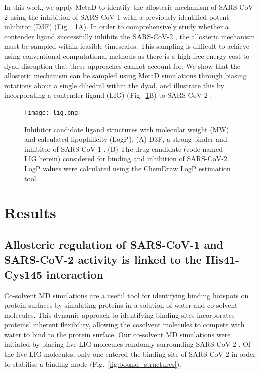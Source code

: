 In this work, we apply MetaD to identify the allosteric mechanism of SARS-CoV-2 \mpro using the inhibition of SARS-CoV-1 \mpro with a previously identified potent inhibitor (D3F)\cite{d3f} (Fig.~ \ref{fig:structures}A). In order to comprehensively study whether a contender ligand successfully inhibits the SARS-CoV-2 \mpro\!\!, the \mpro allosteric mechanism must be sampled within feasible timescales. This sampling is difficult to achieve using conventional computational methods as there is a high free energy cost to dyad disruption that these approaches cannot account for. We show that the allosteric mechanism can be sampled using MetaD simulations through biasing rotations about a single dihedral within the dyad, and illustrate this by incorporating a contender ligand (LIG) (Fig.~\ref{fig:structures}B) to SARS-CoV-2 \mpro\!\!.

\begin{figure}
\centering
\texttt{[image: lig.png]}
\caption{Inhibitor candidate ligand structures with molecular weight (MW) and calculated lipophilicity (LogP). (A) D3F, a strong binder and inhibitor of SARS-CoV-1 \mpro\!\!. (B) The drug candidate (code named LIG herein) considered for binding and inhibition of SARS-CoV-2. LogP values were calculated using the ChemDraw LogP estimation tool.}
\label{fig:structures}
\end{figure}


\section{Results}
%
\subsection{Allosteric regulation of SARS-CoV-1 and SARS-CoV-2 \mpro activity is linked to the His41-Cys145 interaction}

Co-solvent MD simulations \cite{seco2009binding} are a useful tool for identifying binding hotspots on protein surfaces by simulating proteins in a solution of water and co-solvent molecules. This dynamic approach to identifying binding sites incorporates proteins' inherent flexibility, allowing the cosolvent molecules to compete with water to bind to the protein surface.\cite{ghanakota2016driving} Our co-solvent MD simulations were initiated by placing five LIG molecules randomly surrounding SARS-CoV-2 \mpro. Of the five LIG molecules, only one entered the binding site of SARS-CoV-2 in order to stabilise a binding mode (Fig.~\ref{fig:bound_structures}). \\

